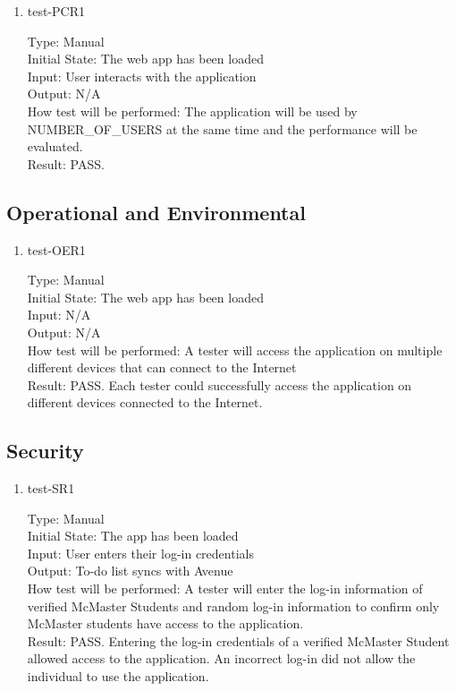 \documentclass[12pt, titlepage]{article}
\begin{document}
\begin{enumerate}
\item{test-PCR1\\}

Type: Manual\\
Initial State: The web app has been loaded\\
Input: User interacts with the application\\
Output: N/A\\
How test will be performed: The application will be used by NUMBER\_OF\_USERS at the same time and the performance will be evaluated.\\
Result: PASS.

\end{enumerate}

\subsection{Operational and Environmental}

\begin{enumerate}
\item{test-OER1\\}

Type: Manual\\
Initial State: The web app has been loaded\\
Input: N/A\\
Output: N/A\\
How test will be performed: A tester will access the application on multiple different devices that can connect to the Internet\\
Result: PASS. Each tester could successfully access the application on different devices connected to the Internet.

\end{enumerate}

\subsection{Security}

\begin{enumerate}
\item{test-SR1\\}

Type: Manual\\
Initial State: The app has been loaded\\
Input: User enters their log-in credentials\\
Output: To-do list syncs with Avenue\\
How test will be performed: A tester will enter the log-in information of verified McMaster Students and random log-in information to confirm only McMaster students have access to the application.\\
Result: PASS. Entering the log-in credentials of a verified McMaster Student allowed access to the application. An incorrect log-in did not allow the individual to use the application. 

\end{enumerate}
\end{document}
